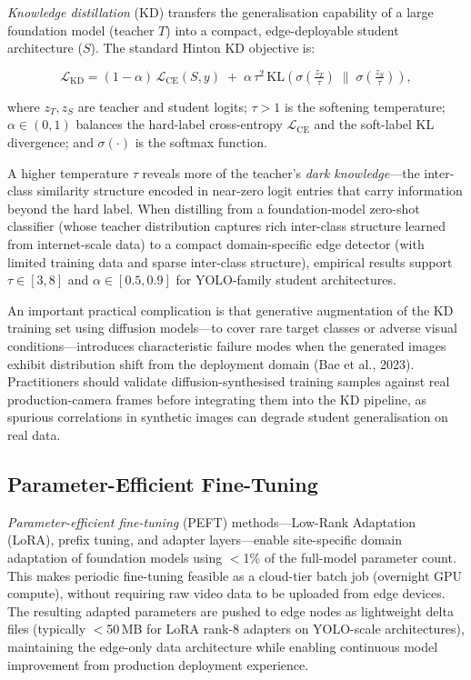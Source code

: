 \documentclass[11pt,a4paper]{article}
\begin{document}
\textit{Knowledge distillation} (KD) transfers the generalisation
capability of a large foundation model (teacher $T$) into a compact,
edge-deployable student architecture ($S$). The standard Hinton
KD objective is:

\begin{equation}
  \mathcal{L}_\mathrm{KD}
  = (1-\alpha)\,\mathcal{L}_\mathrm{CE}(S, y)
  \;+\;
  \alpha\,\tau^2\,
  \mathrm{KL}\!\left(
    \sigma\!\!\left(\tfrac{z_T}{\tau}\right)
    \;\Big\|\;
    \sigma\!\!\left(\tfrac{z_S}{\tau}\right)
  \right),
  \label{eq:kd}
\end{equation}

\noindent where $z_T, z_S$ are teacher and student logits; $\tau > 1$
is the softening temperature; $\alpha \in (0,1)$ balances the
hard-label cross-entropy $\mathcal{L}_\mathrm{CE}$ and the soft-label
KL divergence; and $\sigma(\cdot)$ is the softmax function.

A higher temperature $\tau$ reveals more of the teacher's
\emph{dark knowledge}---the inter-class similarity structure encoded
in near-zero logit entries that carry information beyond the
hard label. When distilling from a foundation-model zero-shot
classifier (whose teacher distribution captures rich inter-class
structure learned from internet-scale data) to a compact
domain-specific edge detector (with limited training data and
sparse inter-class structure), empirical results support
$\tau \in [3, 8]$ and $\alpha \in [0.5, 0.9]$ for YOLO-family
student architectures.

An important practical complication is that generative augmentation
of the KD training set using diffusion models---to cover rare target
classes or adverse visual conditions---introduces characteristic
failure modes when the generated images exhibit distribution shift
from the deployment domain (Bae et al., 2023). Practitioners should
validate diffusion-synthesised training samples against real
production-camera frames before integrating them into the KD
pipeline, as spurious correlations in synthetic images can degrade
student generalisation on real data.

\subsection{Parameter-Efficient Fine-Tuning}

\textit{Parameter-efficient fine-tuning} (PEFT) methods---Low-Rank
Adaptation (LoRA), prefix tuning, and adapter layers---enable
site-specific domain adaptation of foundation models using
$<$1\% of the full-model parameter count. This makes periodic
fine-tuning feasible as a cloud-tier batch job (overnight GPU
compute), without requiring raw video data to be uploaded from
edge devices. The resulting adapted parameters are pushed to
edge nodes as lightweight delta files (typically $<$50\,MB for
LoRA rank-8 adapters on YOLO-scale architectures), maintaining
the edge-only data architecture while enabling continuous model
improvement from production deployment experience.
\end{document}
